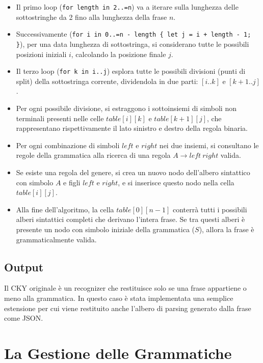 \begin{itemize}
  \item Il primo loop (\texttt{for length in 2..=n}) va a iterare sulla lunghezza delle sottostringhe da 2 fino alla lunghezza della frase $n$. 
  \item Successivamente (\texttt{for i in 0..=n - length \{ let j = i + length - 1; \}}), per una data lunghezza di sottostringa, si considerano tutte le possibili posizioni iniziali $i$, calcolando la posizione finale $j$.
  \item Il terzo loop (\texttt{for k in i..j}) esplora tutte le possibili divisioni (punti di split) della sottostringa corrente, dividendola in due parti: $[i..k]$ e $[k+1..j]$.
  \item Per ogni possibile divisione, si estraggono i sottoinsiemi di simboli non terminali presenti nelle celle $table[i][k]$ e $table[k+1][j]$, che rappresentano rispettivamente il lato sinistro e destro della regola binaria.
  \item Per ogni combinazione di simboli $left$ e $right$ nei due insiemi, si consultano le regole della grammatica alla ricerca di una regola $A \rightarrow left\ right$ valida.
  \item Se esiste una regola del genere, si crea un nuovo nodo dell'albero sintattico con simbolo $A$ e figli $left$ e $right$, e si inserisce questo nodo nella cella $table[i][j]$.
  \item Alla fine dell'algoritmo, la cella $table[0][n-1]$ conterrà tutti i possibili alberi sintattici completi che derivano l'intera frase. Se tra questi alberi è presente un nodo con simbolo iniziale della grammatica ($S$), allora la frase è grammaticalmente valida.
\end{itemize}


\subsection{Output}

Il CKY originale è un recognizer che restituisce solo se una frase appartiene o meno alla grammatica. In questo caso è stata implementata una semplice estensione per cui viene restituito anche l'albero di parsing generato dalla frase come JSON. 

\section{La Gestione delle Grammatiche}

